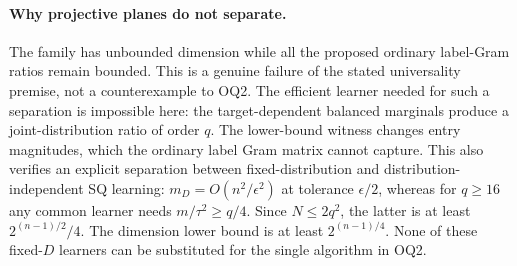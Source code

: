 \documentclass[11pt]{article}
\newcommand{\1}{\mathbf 1}
\begin{document}
\paragraph{Why projective planes do not separate.}
The family has unbounded dimension while all the proposed ordinary label-Gram ratios remain bounded. This is a genuine failure of the stated universality premise, not a counterexample to OQ2. The efficient learner needed for such a separation is impossible here: the target-dependent balanced marginals produce a joint-distribution ratio of order $q$. The lower-bound witness changes entry magnitudes, which the ordinary label Gram matrix cannot capture. This also verifies an explicit separation between fixed-distribution and distribution-independent SQ learning: $m_D=O(n^2/\epsilon^2)$ at tolerance $\epsilon/2$, whereas for $q\geq16$ any common learner needs $m/\tau^2\geq q/4$. Since $N\leq2q^2$, the latter is at least $2^{(n-1)/2}/4$. The dimension lower bound is at least $2^{(n-1)/4}$. None of these fixed-$D$ learners can be substituted for the single algorithm in OQ2.
\end{document}
